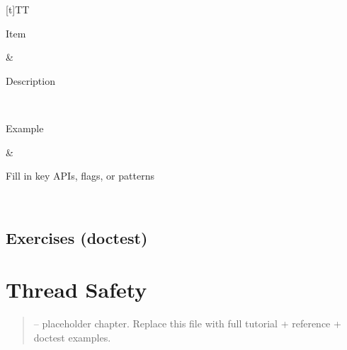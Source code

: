 \documentclass[a4paper,11pt,english]{sphinxmanual}
\begin{document}
\begin{savenotes}\sphinxattablestart
\sphinxthistablewithglobalstyle
\centering
\begin{tabulary}{\linewidth}[t]{TT}
\sphinxtoprule
\begin{varwidth}[t]{}
\sphinxstyletheadfamily \sphinxAtStartPar
Item
\sphinxbeforeendvarwidth
\end{varwidth}%
&\begin{varwidth}[t]{}
\sphinxstyletheadfamily \sphinxAtStartPar
Description
\sphinxbeforeendvarwidth
\end{varwidth}%
\\
\sphinxmidrule
\sphinxtableatstartofbodyhook\begin{varwidth}[t]{}
\sphinxAtStartPar
Example
\sphinxbeforeendvarwidth
\end{varwidth}%
&\begin{varwidth}[t]{}
\sphinxAtStartPar
Fill in key APIs, flags, or patterns
\sphinxbeforeendvarwidth
\end{varwidth}%
\\
\sphinxbottomrule
\end{tabulary}
\sphinxtableafterendhook\par
\sphinxattableend\end{savenotes}


\subsection{Exercises (doctest)}
\label{\detokenize{concurrency/multiprocessing:exercises-doctest}}
\begin{sphinxVerbatim}[commandchars=\\\{\}]
\end{sphinxVerbatim}

\sphinxstepscope


\section{Thread Safety}
\label{\detokenize{concurrency/thread_safety:thread-safety}}\label{\detokenize{concurrency/thread_safety::doc}}\begin{quote}

\sphinxAtStartPar
{} – placeholder chapter. Replace this file with full tutorial + reference + doctest examples.
\end{quote}
\end{document}
